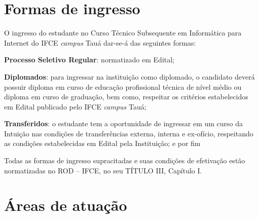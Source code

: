 \documentclass[
	12pt,				%
	openright,			%
	twoside,			%
	a4paper,			%
	chapter=TITLE,		%
	english,			%
	french,				%
	spanish,			%
	brazil,				%
	]{abntex2}
\begin{document}
\chapter{Formas de ingresso}


O ingresso do estudante no Curso Técnico Subsequente em Informática para Internet do IFCE \textit{campus} Tauá dar-se-á das seguintes formas:

\begin{alineas}
    \item \textbf{Processo Seletivo Regular}: normatizado em Edital;
    
    \item \textbf{Diplomados}: para ingressar na instituição como diplomado, o candidato deverá possuir diploma em curso de educação profissional técnica de nível médio ou diploma em curso de graduação, bem como, respeitar os critérios estabelecidos em Edital publicado pelo IFCE \textit{campus} Tauá;
    
    \item \textbf{Transferidos}: o estudante tem a oportunidade de ingressar em um curso da Intuição nas condições de transferências externa, interna e ex-ofício, respeitando as condições estabelecidas em Edital pela Instituição; e por fim
    
\end{alineas}

Todas as formas de ingresso supracitadas e suas condições de efetivação estão normatizadas no  ROD -- IFCE, no seu TÍTULO III, Capítulo I.


\chapter{Áreas de atuação}
\end{document}
